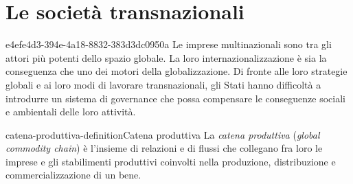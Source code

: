 \documentclass[preview]{standalone}
\begin{document}
\genpage

\section{Le società transnazionali}

\begin{snippet}{e4efe4d3-394e-4a18-8832-383d3dc0950a}
    Le imprese multinazionali sono tra gli attori più potenti dello spazio globale. La loro
    internazionalizzazione è sia la conseguenza che uno dei motori della globalizzazione. Di fronte alle loro
    strategie globali e ai loro modi di lavorare transnazionali, gli Stati hanno difficoltà a introdurre un
    sistema di governance che possa compensare le conseguenze sociali e ambientali delle loro attività.
\end{snippet}


\begin{snippetdefinition}{catena-produttiva-definition}{Catena produttiva}
    La \textit{catena produttiva} (\textit{global commodity chain}) è l'insieme di relazioni e di flussi che collegano
    fra loro le imprese e gli stabilimenti produttivi coinvolti nella 
    produzione, distribuzione e commercializzazione di un bene.
\end{snippetdefinition}
\end{document}
